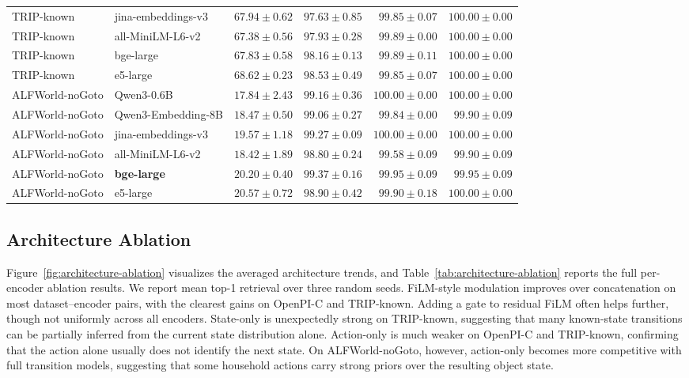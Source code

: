 \documentclass{article}
\begin{document}
\begin{table}[t]
\begin{tabular}{llrrrr}
    TRIP-known & jina-embeddings-v3 & $67.94{\pm}0.62$ & $97.63{\pm}0.85$ & $99.85{\pm}0.07$ & $100.00{\pm}0.00$ \\
    TRIP-known & all-MiniLM-L6-v2 & $67.38{\pm}0.56$ & $97.93{\pm}0.28$ & $99.89{\pm}0.00$ & $100.00{\pm}0.00$ \\
    TRIP-known & bge-large & $67.83{\pm}0.58$ & $98.16{\pm}0.13$ & $99.89{\pm}0.11$ & $100.00{\pm}0.00$ \\
    TRIP-known & e5-large & $68.62{\pm}0.23$ & $98.53{\pm}0.49$ & $99.85{\pm}0.07$ & $100.00{\pm}0.00$ \\
    \midrule
    ALFWorld-noGoto & Qwen3-0.6B & $17.84{\pm}2.43$ & $99.16{\pm}0.36$ & $100.00{\pm}0.00$ & $100.00{\pm}0.00$ \\
    ALFWorld-noGoto & Qwen3-Embedding-8B & $18.47{\pm}0.50$ & $99.06{\pm}0.27$ & $99.84{\pm}0.00$ & $99.90{\pm}0.09$ \\
    ALFWorld-noGoto & jina-embeddings-v3 & $19.57{\pm}1.18$ & $99.27{\pm}0.09$ & $100.00{\pm}0.00$ & $100.00{\pm}0.00$ \\
    ALFWorld-noGoto & all-MiniLM-L6-v2 & $18.42{\pm}1.89$ & $98.80{\pm}0.24$ & $99.58{\pm}0.09$ & $99.90{\pm}0.09$ \\
    ALFWorld-noGoto & \textbf{bge-large} & $20.20{\pm}0.40$ & $\mathbf{99.37{\pm}0.16}$ & $99.95{\pm}0.09$ & $99.95{\pm}0.09$ \\
    ALFWorld-noGoto & e5-large & $20.57{\pm}0.72$ & $98.90{\pm}0.42$ & $99.90{\pm}0.18$ & $100.00{\pm}0.00$ \\
    \bottomrule
  \end{tabular}
\end{table}

\subsection{Architecture Ablation}

Figure~\ref{fig:architecture-ablation} visualizes the averaged architecture trends, and Table~\ref{tab:architecture-ablation} reports the full per-encoder ablation results. We report mean top-1 retrieval over three random seeds. FiLM-style modulation improves over concatenation on most dataset--encoder pairs, with the clearest gains on OpenPI-C and TRIP-known. Adding a gate to residual FiLM often helps further, though not uniformly across all encoders. State-only is unexpectedly strong on TRIP-known, suggesting that many known-state transitions can be partially inferred from the current state distribution alone. Action-only is much weaker on OpenPI-C and TRIP-known, confirming that the action alone usually does not identify the next state. On ALFWorld-noGoto, however, action-only becomes more competitive with full transition models, suggesting that some household actions carry strong priors over the resulting object state.
\end{document}
